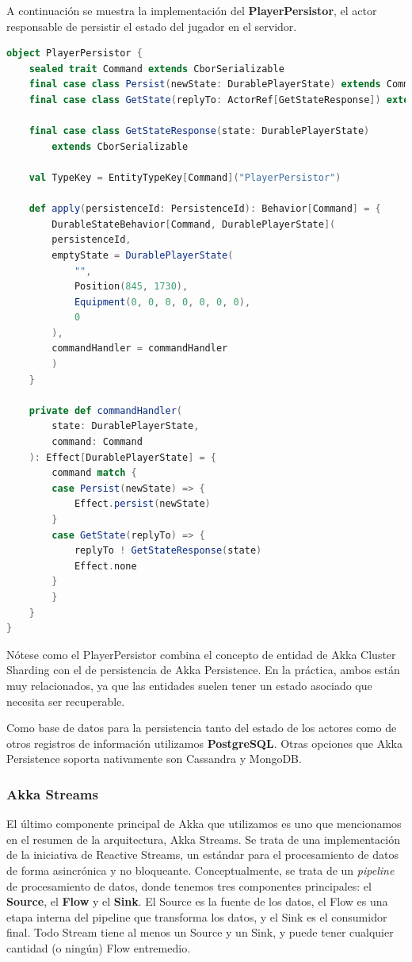 A continuación se muestra la implementación del \textbf{PlayerPersistor}, el actor responsable de persistir el estado del jugador en el servidor.

\begin{lstlisting}[language=Scala, caption={\textbf{Implementación del PlayerPersistor}}]
object PlayerPersistor {
    sealed trait Command extends CborSerializable
    final case class Persist(newState: DurablePlayerState) extends Command
    final case class GetState(replyTo: ActorRef[GetStateResponse]) extends Command
    
    final case class GetStateResponse(state: DurablePlayerState)
        extends CborSerializable
    
    val TypeKey = EntityTypeKey[Command]("PlayerPersistor")
    
    def apply(persistenceId: PersistenceId): Behavior[Command] = {
        DurableStateBehavior[Command, DurablePlayerState](
        persistenceId,
        emptyState = DurablePlayerState(
            "",
            Position(845, 1730),
            Equipment(0, 0, 0, 0, 0, 0, 0),
            0
        ),
        commandHandler = commandHandler
        )
    }
    
    private def commandHandler(
        state: DurablePlayerState,
        command: Command
    ): Effect[DurablePlayerState] = {
        command match {
        case Persist(newState) => {
            Effect.persist(newState)
        }
        case GetState(replyTo) => {
            replyTo ! GetStateResponse(state)
            Effect.none
        }
        }
    }
}
\end{lstlisting}

Nótese como el PlayerPersistor combina el concepto de entidad de Akka Cluster Sharding con el de persistencia de Akka Persistence. En la práctica, ambos están muy relacionados,
ya que las entidades suelen tener un estado asociado que necesita ser recuperable.

Como base de datos para la persistencia tanto del estado de los actores como de otros registros de información utilizamos
\textbf{PostgreSQL}. Otras opciones que Akka Persistence soporta nativamente son Cassandra y MongoDB.

\subsubsection{Akka Streams}

\noindent El último componente principal de Akka que utilizamos es uno que mencionamos en el resumen de la arquitectura, Akka Streams.
Se trata de una implementación de la iniciativa de Reactive Streams, un estándar para el procesamiento de datos de forma asincrónica y no bloqueante.
Conceptualmente, se trata de un \textit{pipeline} de procesamiento de datos, donde tenemos tres componentes principales: el \textbf{Source},
el \textbf{Flow} y el \textbf{Sink}. El Source es la fuente de los datos, el Flow es una etapa interna del pipeline que transforma los datos, y el
Sink es el consumidor final. Todo Stream tiene al menos un Source y un Sink, y puede tener cualquier cantidad (o ningún) Flow entremedio.

